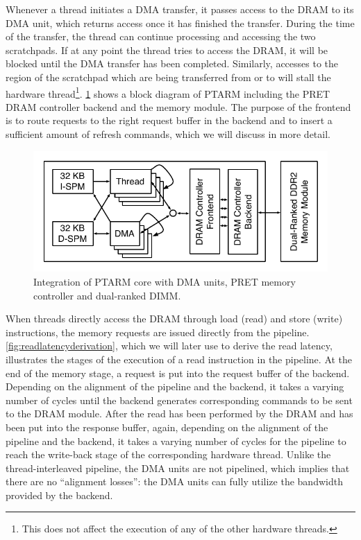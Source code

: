 Whenever a thread initiates a DMA transfer, it passes access to the DRAM to its DMA unit, which returns access once it has finished the transfer. 
During the time of the transfer, the thread can continue processing and accessing the two scratchpads.
If at any point the thread tries to access the DRAM, it will be blocked until the DMA transfer has been completed.
Similarly, accesses to the region of the scratchpad which are being transferred from or to will stall the hardware thread\footnote{This does not affect the execution of any of the other hardware threads.}.
\ref{fig:pretintegration} shows a block diagram of PTARM including the PRET DRAM controller backend and the memory module.
The purpose of the frontend is to route requests to the right request buffer in the backend and to insert a sufficient amount of refresh commands, which we will discuss in more detail.

\begin{figure}
\begin{center}
\includegraphics[width=0.7\linewidth]{figs/pret-integration}
\end{center}
\caption{Integration of PTARM core with DMA units, PRET memory controller and dual-ranked DIMM.}\label{fig:pretintegration} %
\end{figure}

When threads directly access the DRAM through load (read) and store (write) instructions, the memory requests are issued directly from the pipeline. 
\ref{fig:readlatencyderivation}, which we will later use to derive the read latency, illustrates the stages of the execution of a read instruction in the pipeline.
At the end of the memory stage, a request is put into the request buffer of the backend.
Depending on the alignment of the pipeline and the backend, it takes a varying number of cycles until the backend generates corresponding commands to be sent to the DRAM module.
After the read has been performed by the DRAM and has been put into the response buffer, again, depending on the alignment of the pipeline and the backend, it takes a varying number of cycles for the pipeline to reach the write-back stage of the corresponding hardware thread.
Unlike the thread-interleaved pipeline, the DMA units are not pipelined, which implies that there are no ``alignment losses'':
the DMA units can fully utilize the bandwidth provided by the backend.


